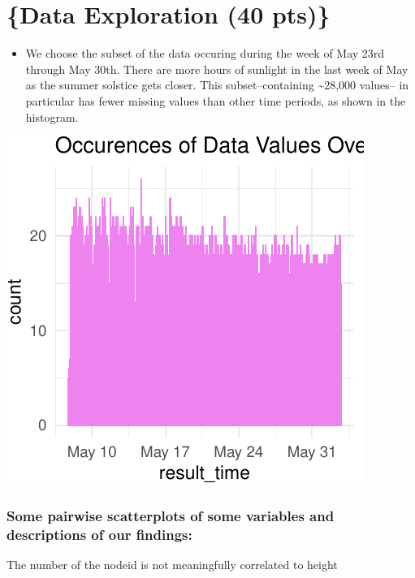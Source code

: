 \documentclass[]{article}
\providecommand{\tightlist}{%
  \setlength{\itemsep}{0pt}\setlength{\parskip}{0pt}}
\begin{document}
\section{\{Data Exploration (40 pts)\}}\label{data-exploration-40-pts}

\begin{itemize}
\tightlist
\item
  We choose the subset of the data occuring during the week of May 23rd
  through May 30th. There are more hours of sunlight in the last week of
  May as the summer solstice gets closer. This subset--containing
  \textasciitilde{}28,000 values-- in particular has fewer missing
  values than other time periods, as shown in the histogram.
\end{itemize}

\begin{center}\includegraphics{Project1WriteUp_files/figure-latex/unnamed-chunk-11-1} \end{center}

\subsubsection{Some pairwise scatterplots of some variables and
descriptions of our
findings:}\label{some-pairwise-scatterplots-of-some-variables-and-descriptions-of-our-findings}

The number of the nodeid is not meaningfully correlated to height
\end{document}
